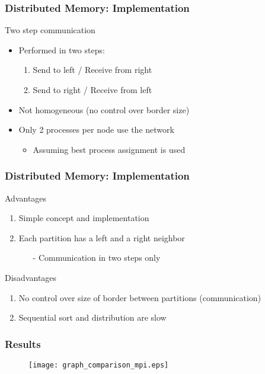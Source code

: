 \begin{frame}
	\frametitle{Distributed Memory: Implementation}

	\begin{block}{Two step communication}
		\begin{itemize}\itemsep=20pt
			\item Performed in two steps:
			\begin{enumerate}\itemsep=10pt
				\item Send to left / Receive from right
				\item Send to right / Receive from left
			\end{enumerate}

			\item Not homogeneous (no control over border size)

			\item Only 2 processes per node use the network
			\begin{itemize}
				\item Assuming best process assignment is used
			\end{itemize}
		\end{itemize}
	\end{block}
\end{frame}

\begin{frame}
\frametitle{Distributed Memory: Implementation}

	\begin{block}{Advantages}
		\begin{enumerate}\itemsep=10pt
			\item Simple concept and implementation
			\item Each partition has a left and a right neighbor
			\begin{itemize}
				\item[-] Communication in two steps only
			\end{itemize}
		\end{enumerate}
	\end{block}
	\pause

	\begin{block}{Disadvantages}
		\begin{enumerate}\itemsep=10pt
			\item No control over size of border between partitions (communication)
			\item Sequential sort and distribution are slow
		\end{enumerate}
	\end{block}

\end{frame}

\begin{frame}
	\frametitle{Results}
	\begin{figure}
		\centering
		\texttt{[image: graph\_comparison\_mpi.eps]}
	\end{figure}
\end{frame}

